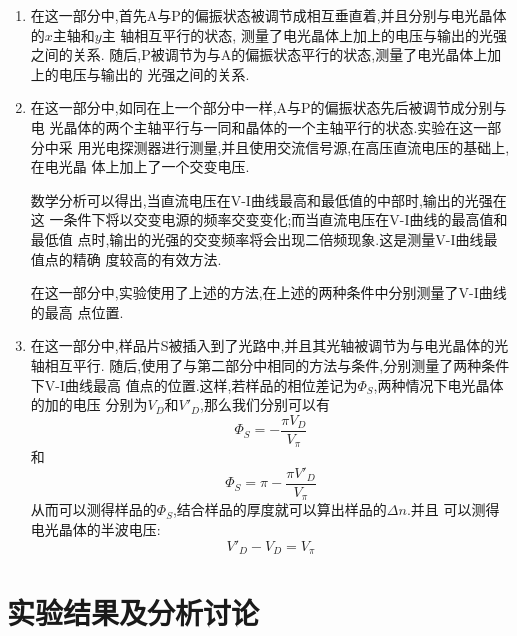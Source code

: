 \documentclass[aps,pre,12pt,preprint,onecolumn,showpacs,showkeys]{revtex4-1}
\begin{document}
\begin{enumerate}
    \item 在这一部分中,首先A与P的偏振状态被调节成相互垂直着,并且分别与电光晶体的$x$主轴和$y$主
        轴相互平行的状态, 测量了电光晶体上加上的电压与输出的光强之间的关系.
        随后,P被调节为与A的偏振状态平行的状态,测量了电光晶体上加上的电压与输出的
        光强之间的关系.
    \item 在这一部分中,如同在上一个部分中一样,A与P的偏振状态先后被调节成分别与电
        光晶体的两个主轴平行与一同和晶体的一个主轴平行的状态.实验在这一部分中采
        用光电探测器进行测量,并且使用交流信号源,在高压直流电压的基础上,在电光晶
        体上加上了一个交变电压.

        数学分析可以得出,当直流电压在V-I曲线最高和最低值的中部时,输出的光强在这
        一条件下将以交变电源的频率交变变化;而当直流电压在V-I曲线的最高值和最低值
        点时,输出的光强的交变频率将会出现二倍频现象.这是测量V-I曲线最值点的精确
        度较高的有效方法.

        在这一部分中,实验使用了上述的方法,在上述的两种条件中分别测量了V-I曲线的最高
        点位置.
    \item 在这一部分中,样品片S被插入到了光路中,并且其光轴被调节为与电光晶体的光
        轴相互平行.
        随后,使用了与第二部分中相同的方法与条件,分别测量了两种条件下V-I曲线最高
        值点的位置.这样,若样品的相位差记为$\Phi_S$,两种情况下电光晶体的加的电压
        分别为$V_D$和$V'_D$,那么我们分别可以有
        \begin{equation}
            \Phi_S = -\frac{\pi V_D}{V_{\pi}}
        \end{equation}
        和
        \begin{equation}
            \Phi_S = \pi - \frac{\pi V'_D}{V_{\pi}}
        \end{equation}
        从而可以测得样品的$\Phi_S$,结合样品的厚度就可以算出样品的$\Delta n$.并且
        可以测得电光晶体的半波电压:
        \begin{equation}
            V'_D - V_D = V_{\pi}
        \end{equation}
\end{enumerate}

\section{实验结果及分析讨论}
\end{document}

